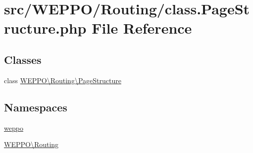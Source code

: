 \hypertarget{class_8PageStructure_8php}{}\section{src/\+W\+E\+P\+P\+O/\+Routing/class.Page\+Structure.\+php File Reference}
\label{class_8PageStructure_8php}
\subsection*{Classes}
\begin{DoxyCompactItemize}
\item 
class \hyperlink{classWEPPO_1_1Routing_1_1PageStructure}{W\+E\+P\+P\+O\textbackslash{}\+Routing\textbackslash{}\+Page\+Structure}
\end{DoxyCompactItemize}
\subsection*{Namespaces}
\begin{DoxyCompactItemize}
\item 
 \hyperlink{namespaceweppo}{weppo}
\item 
 \hyperlink{namespaceWEPPO_1_1Routing}{W\+E\+P\+P\+O\textbackslash{}\+Routing}
\end{DoxyCompactItemize}
